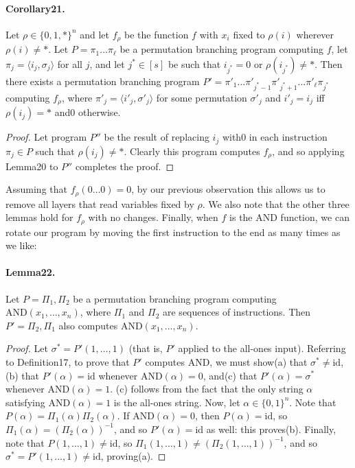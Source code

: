 \documentclass[10pt,a4paper]{article}
\begin{document}
\paragraph{Corollary21.} Let $\rho\in\{0,1,*\}^n$ and let $f_{\rho}$ be the function $f$ with $x_i$ fixed to $\rho(i)$ wherever $\rho(i)\neq*$. Let $P=\pi_1\ldots\pi_{\ell}$ be a permutation branching program computing $f$, let $\pi_j=\langle i_j,\sigma_j\rangle$ for all $j$, and let $j^*\in[s]$ be such that $i_{j^*}=0$ or $\rho(i_{j^*})\neq*$. Then there exists a permutation branching program $P'=\pi'_1\ldots\pi'_{j^*-1}\pi'_{j^*+1}\ldots\pi'_{\ell}\pi_{j^*}$ computing $f_{\rho}$, where $\pi'_j=\langle i'_j,\sigma'_j\rangle$ for some permutation $\sigma'_j$ and $i'_j=i_j$ iff $\rho(i_j)=*$ and0 otherwise.
\begin{proof}
Let program $P''$ be the result of replacing $i_j$ with0 in each instruction $\pi_j\in P$ such that $\rho(i_j)\neq*$. Clearly this program computes $f_{\rho}$, and so applying Lemma20 to $P''$ completes the proof.
\end{proof}
Assuming that $f_{\rho}(0\ldots0)=0$, by our previous observation this allows us to remove all layers that read variables fixed by $\rho$. We also note that the other three lemmas hold for $f_{\rho}$ with no changes.
Finally, when $f$ is the AND function, we can rotate our program by moving the first instruction to the end as many times as we like:
\paragraph{Lemma22.} Let $P=\Pi_1,\Pi_2$ be a permutation branching program computing $\mathrm{AND}(x_1,\ldots,x_n)$, where $\Pi_1$ and $\Pi_2$ are sequences of instructions. Then $P'=\Pi_2,\Pi_1$ also computes $\mathrm{AND}(x_1,\ldots,x_n)$.
\begin{proof}
Let $\sigma^*=P'(1,\ldots,1)$ (that is, $P'$ applied to the all-ones input). Referring to Definition17, to prove that $P'$ computes AND, we must show(a) that $\sigma^*\neq\mathrm{id}$,(b) that $P'(\alpha)=\mathrm{id}$ whenever $\mathrm{AND}(\alpha)=0$, and(c) that $P'(\alpha)=\sigma^*$ whenever $\mathrm{AND}(\alpha)=1$.
(c) follows from the fact that the only string $\alpha$ satisfying $\mathrm{AND}(\alpha)=1$ is the all-ones string.
Now, let $\alpha\in\{0,1\}^n$. Note that $P(\alpha)=\Pi_1(\alpha)\Pi_2(\alpha)$. If $\mathrm{AND}(\alpha)=0$, then $P(\alpha)=\mathrm{id}$, so $\Pi_1(\alpha)=(\Pi_2(\alpha))^{-1}$, and so $P'(\alpha)=\mathrm{id}$ as well: this proves(b).
Finally, note that $P(1,\ldots,1)\neq\mathrm{id}$, so $\Pi_1(1,\ldots,1)\neq(\Pi_2(1,\ldots,1))^{-1}$, and so $\sigma^*=P'(1,\ldots,1)\neq\mathrm{id}$, proving(a).
\end{proof}
\end{document}

